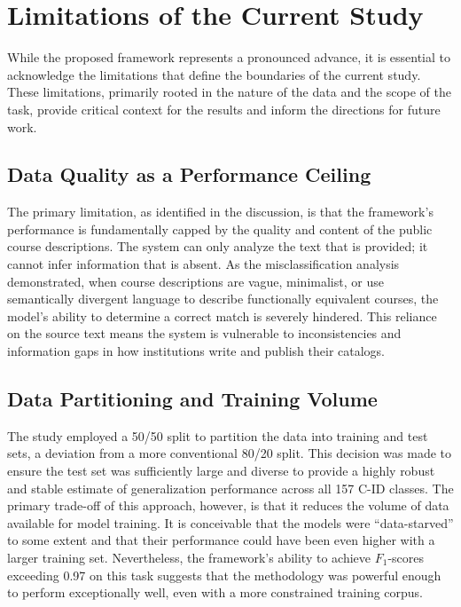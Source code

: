 \section{Limitations of the Current Study}\label{ch:5.2}
While the proposed framework represents a pronounced advance, it is essential to acknowledge the limitations that define the boundaries of the current study. These limitations, primarily rooted in the nature of the data and the scope of the task, provide critical context for the results and inform the directions for future work.

\subsection{Data Quality as a Performance Ceiling}\label{ch:5.2.1}
The primary limitation, as identified in the discussion, is that the framework's performance is fundamentally capped by the quality and content of the public course descriptions. The system can only analyze the text that is provided; it cannot infer information that is absent. As the misclassification analysis demonstrated, when course descriptions are vague, minimalist, or use semantically divergent language to describe functionally equivalent courses, the model's ability to determine a correct match is severely hindered. This reliance on the source text means the system is vulnerable to inconsistencies and information gaps in how institutions write and publish their catalogs.

\subsection{Data Partitioning and Training Volume}\label{ch:5.2.1b}
The study employed a 50/50 split to partition the data into training and test sets, a deviation from a more conventional 80/20 split. This decision was made to ensure the test set was sufficiently large and diverse to provide a highly robust and stable estimate of generalization performance across all 157 C-ID classes. The primary trade-off of this approach, however, is that it reduces the volume of data available for model training. It is conceivable that the models were ``data-starved'' to some extent and that their performance could have been even higher with a larger training set. Nevertheless, the framework's ability to achieve \(F_1\)-scores exceeding 0.97 on this task suggests that the methodology was powerful enough to perform exceptionally well, even with a more constrained training corpus.

